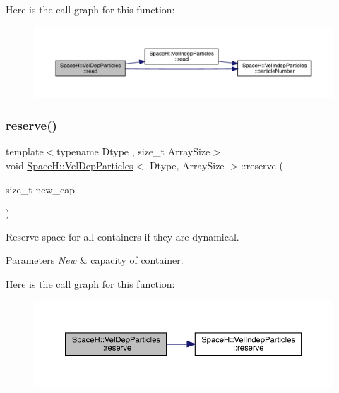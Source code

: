 Here is the call graph for this function\+:
\nopagebreak
\begin{figure}[H]
\begin{center}
\leavevmode
\includegraphics[width=350pt]{class_space_h_1_1_vel_dep_particles_a8bcbe3fac720dc62485e08f5098cb477_cgraph}
\end{center}
\end{figure}
\mbox{\label{class_space_h_1_1_vel_dep_particles_a47b3d3219ae00febce8c2a3d779f5aee}} 
\subsubsection{\texorpdfstring{reserve()}{reserve()}}
{\footnotesize\ttfamily template$<$typename Dtype , size\+\_\+t Array\+Size$>$ \\
void \mbox{\hyperlink{class_space_h_1_1_vel_dep_particles}{Space\+H\+::\+Vel\+Dep\+Particles}}$<$ Dtype, Array\+Size $>$\+::reserve (\begin{DoxyParamCaption}\item[{size\+\_\+t}]{new\+\_\+cap }\end{DoxyParamCaption})\hspace{0.3cm}{\ttfamily [inline]}}



Reserve space for all containers if they are dynamical. 


\begin{DoxyParams}{Parameters}
{\em New} & capacity of container. \\
\hline
\end{DoxyParams}
Here is the call graph for this function\+:
\nopagebreak
\begin{figure}[H]
\begin{center}
\leavevmode
\includegraphics[width=350pt]{class_space_h_1_1_vel_dep_particles_a47b3d3219ae00febce8c2a3d779f5aee_cgraph}
\end{center}
\end{figure}
\mbox{\label{class_space_h_1_1_vel_dep_particles_a38c984c371c95273fded00e1810473f9}} 
